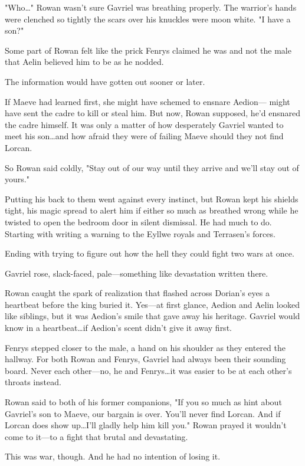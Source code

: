 "Who\ldots" Rowan wasn't sure Gavriel was breathing properly.
The warrior's hands were clenched so tightly the scars over his knuckles were moon white.
"I have a son?"

Some part of Rowan felt like the prick Fenrys claimed he was and not the male that Aelin believed him to be as he nodded.

The information would have gotten out sooner or later.

If Maeve had learned first, she might have schemed to ensnare Aedion--- might have sent the cadre to kill or steal him.
But now, Rowan supposed, he'd ensnared the cadre himself.
It was only a matter of how desperately Gavriel wanted to meet his son\ldots and how afraid they were of failing Maeve should they not find Lorcan.

So Rowan said coldly, "Stay out of our way until they arrive and we'll stay out of yours."

Putting his back to them went against every instinct, but Rowan kept his shields tight, his magic spread to alert him if either so much as breathed wrong while he twisted to open the bedroom door in silent dismissal.
He had much to do.
Starting with writing a warning to the Eyllwe royals and Terrasen's forces.

Ending with trying to figure out how the hell they could fight two wars at once.

Gavriel rose, slack-faced, pale---something like devastation written there.

Rowan caught the spark of realization that flashed across Dorian's eyes a heartbeat before the king buried it.
Yes---at first glance, Aedion and Aelin looked like siblings, but it was Aedion's smile that gave away his heritage.
Gavriel would know in a heartbeat\ldots if Aedion's scent didn't give it away first.

Fenrys stepped closer to the male, a hand on his shoulder as they entered the hallway.
For both Rowan and Fenrys, Gavriel had always been their sounding board.
Never each other---no, he and Fenrys\ldots it was easier to be at each other's throats instead.

Rowan said to both of his former companions, "If you so much as hint about Gavriel's son to Maeve, our bargain is over.
You'll never find Lorcan.
And if Lorcan does show up\ldots I'll gladly help him kill you."
Rowan prayed it wouldn't come to it---to a fight that brutal and devastating.

This was war, though.
And he had no intention of losing it.
